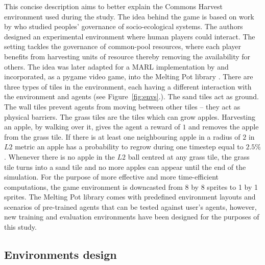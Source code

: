 \documentclass[pdflatex,sn-basic,lineno]{sn-jnl}
\theoremstyle{thmstyleone}%
\theoremstyle{thmstyletwo}%
\theoremstyle{thmstylethree}%
\begin{document}
This concise description aims to better explain the Commons Harvest environment used during the study. The idea behind
the game is based on work by \cite{Janssen2010} who studied peoples' governance of socio-ecological systems. The
authors designed an experimental environment where human players could interact. The setting tackles the governance of
common-pool resources, where each player benefits from harvesting units of resource thereby removing the availability
for others. The idea was later adapted for a MARL implementation by \cite{Perolat2017} and incorporated, as a pygame
video game, into the Melting Pot library \citep{Leibo2021, agapiou2023meltingpot20}. There are three types of tiles in 
the environment, each having a different interaction with the environment and agents
(see Figure~\ref{fig:envs}.). The sand tiles act as ground. The wall tiles prevent agents from moving between other
tiles -- they act as physical barriers. The grass tiles are the tiles which can grow apples. Harvesting an apple, by
walking over it, gives the agent a reward of $1$ and removes the apple from the grass tile. If there is at least one
neighbouring apple in a radius of $2$ in $L2$ metric an apple has a probability to regrow during one timestep equal to
$2.5\%$. Whenever there is no apple in the $L2$ ball centred at any grass tile, the grass tile turns into a sand tile
and no more apples can appear until the end of the simulation. For the purpose of more effective and more time-efficient
computations, the game environment is downcasted from 8 by 8 sprites to 1 by 1 sprites. The Melting 
Pot library comes with predefined environment layouts and scenarios of pre-trained agents that can be tested
against user's agents, however, new training and evaluation environments have been designed for the purposes of this
study.

\subsection{Environments design}\label{subsec3-3}
\end{document}
